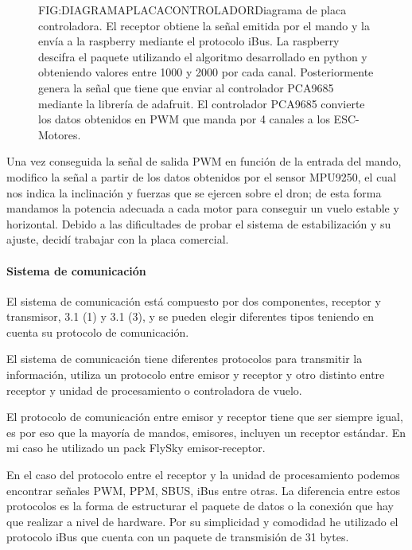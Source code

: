 \begin{figure}[Diagrama placa controladora desarrollada]{FIG:DIAGRAMAPLACACONTROLADOR}{Diagrama de placa controladora. El receptor obtiene la señal emitida por el mando y la envía a la raspberry mediante el protocolo iBus. La raspberry descifra el paquete utilizando el algoritmo desarrollado  en python y obteniendo valores entre 1000 y 2000 por cada canal. Posteriormente genera la señal que tiene que enviar al controlador PCA9685 mediante la librería de adafruit. El controlador PCA9685 convierte los datos obtenidos en PWM que manda por 4 canales a los ESC-Motores.}
\end{figure}

Una vez conseguida la señal de salida PWM en función de la entrada del mando, modifico la señal a partir de los datos obtenidos por el sensor MPU9250, el cual nos indica la inclinación y fuerzas que se ejercen sobre el dron; de esta forma mandamos la potencia adecuada a cada motor para conseguir un vuelo estable y horizontal. Debido a las dificultades de probar el sistema de estabilización y su ajuste, decidí trabajar con la placa comercial.

\paragraph{Sistema de comunicación}

	El sistema de comunicación está compuesto por dos componentes, receptor y transmisor, 3.1 (1) y 3.1 (3), y se pueden elegir diferentes tipos teniendo en cuenta su protocolo de comunicación. 
	
	El sistema de comunicación tiene diferentes protocolos para transmitir la información, utiliza un protocolo entre emisor y receptor y otro distinto entre receptor y unidad de procesamiento o controladora de vuelo.\cite{Eric2017}
	
	
	El protocolo de comunicación entre emisor y receptor tiene que ser siempre igual, es por eso que la mayoría de mandos, emisores, incluyen un receptor estándar. En mi caso he utilizado un pack FlySky emisor-receptor.
	
	En el caso del protocolo entre el receptor y la unidad de procesamiento podemos encontrar señales PWM, PPM, SBUS, iBus entre otras. La diferencia entre estos protocolos es la forma de estructurar el paquete de datos o la conexión que hay que realizar a nivel de hardware. Por su simplicidad y comodidad he utilizado el protocolo iBus que cuenta con un paquete de transmisión de 31 bytes.
	
